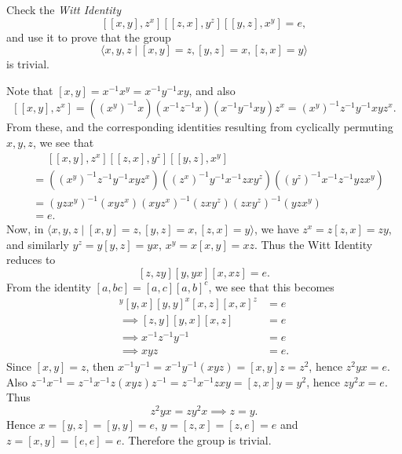\begin{questions}
\question Check the \emph{Witt Identity}
  \[ [[x,y],z^x][[z,x],y^z][[y,z],x^y] = e, \]
  and use it to prove that the group
  \[ \langle x,y,z \mid [x,y]=z, [y,z]=x, [z,x]=y \rangle \]
  is trivial.
  \begin{solution}
    Note that $[x,y]=x^{-1}x^y=x^{-1}y^{-1}xy$, and also
    \[ [[x,y],z^x] = ((x^y)^{-1}x)(x^{-1}z^{-1}x)(x^{-1}y^{-1}xy)z^x = (x^y)^{-1}z^{-1}y^{-1}xyz^x. \]
    From these, and the corresponding identities resulting from cyclically permuting $x,y,z$, we see that
    \begin{align*}
      &\phantom{{}={}}[[x,y],z^x][[z,x],y^z][[y,z],x^y] \\
      &= ((x^y)^{-1}z^{-1}y^{-1}xyz^x)((z^x)^{-1}y^{-1}x^{-1}zxy^z)((y^z)^{-1}x^{-1}z^{-1}yzx^y) \\
      &= (yzx^y)^{-1}(xyz^x)(xyz^x)^{-1}(zxy^z)(zxy^z)^{-1}(yzx^y) \\
      &= e.
    \end{align*}
    Now, in $\langle x,y,z \mid [x,y]=z, [y,z]=x, [z,x]=y \rangle$, we have $z^x=z[z,x]=zy$, and similarly $y^z=y[y,z]=yx$, $x^y=x[x,y]=xz$. Thus the Witt Identity reduces to
    \[ [z,zy][y,yx][x,xz] = e. \]
    From the identity $[a,bc]=[a,c][a,b]^c$, we see that this becomes
    \begin{align*}
      [z,y][z,z]^y[y,x][y,y]^x[x,z][x,x]^z &= e \\
      \implies [z,y][y,x][x,z] &= e \\
      \implies x^{-1}z^{-1}y^{-1} &= e \\
      \implies xyz &= e.
    \end{align*}
    Since $[x,y]=z$, then $x^{-1}y^{-1}=x^{-1}y^{-1}(xyz)=[x,y]z=z^2$, hence $z^2yx=e$. Also $z^{-1}x^{-1}=z^{-1}x^{-1}z(xyz)z^{-1}=z^{-1}x^{-1}zxy=[z,x]y=y^2$, hence $zy^2x=e$. Thus
    \[ z^2yx = zy^2x \implies z = y. \]
    Hence $x=[y,z]=[y,y]=e$, $y=[z,x]=[z,e]=e$ and $z=[x,y]=[e,e]=e$. Therefore the group is trivial.
  \end{solution}




\end{questions}
